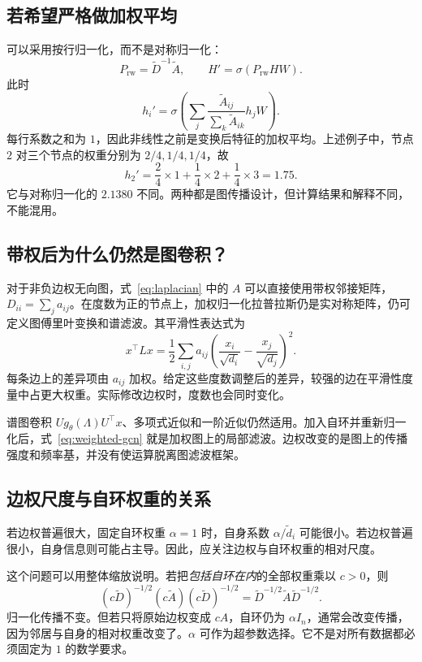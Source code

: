 \documentclass[UTF8,a4paper,11pt,fontset=fandol]{ctexart}
\begin{document}
\subsection{若希望严格做加权平均}
可以采用按行归一化，而不是对称归一化：
\begin{equation}
P_{\mathrm{rw}}=\widetilde D^{-1}\widetilde A,
\qquad H'=\sigma(P_{\mathrm{rw}}HW).
\end{equation}
此时
\begin{equation}
h_i'=\sigma\!\left(\sum_j
\frac{\widetilde A_{ij}}{\sum_k\widetilde A_{ik}}h_jW\right).
\end{equation}
每行系数之和为 $1$，因此非线性之前是变换后特征的加权平均。上述例子中，节点 $2$ 对三个节点的权重分别为 $2/4,1/4,1/4$，故
\begin{equation}
h_2'=\frac24\times1+\frac14\times2+\frac14\times3=1.75.
\end{equation}
它与对称归一化的 $2.1380$ 不同。两种都是图传播设计，但计算结果和解释不同，不能混用。

\subsection{带权后为什么仍然是图卷积？}
对于非负边权无向图，式~\eqref{eq:laplacian} 中的 $A$ 可以直接使用带权邻接矩阵，$D_{ii}=\sum_j a_{ij}$。在度数为正的节点上，加权归一化拉普拉斯仍是实对称矩阵，仍可定义图傅里叶变换和谱滤波。其平滑性表达式为
\begin{equation}
x^\top Lx=\frac12\sum_{i,j}a_{ij}
\left(\frac{x_i}{\sqrt{d_i}}-\frac{x_j}{\sqrt{d_j}}\right)^2.
\end{equation}
每条边上的差异项由 $a_{ij}$ 加权。给定这些度数调整后的差异，较强的边在平滑性度量中占更大权重。实际修改边权时，度数也会同时变化。

谱图卷积 $Ug_\theta(\Lambda)U^\top x$、多项式近似和一阶近似仍然适用。加入自环并重新归一化后，式~\eqref{eq:weighted-gcn} 就是加权图上的局部滤波。边权改变的是图上的传播强度和频率基，并没有使运算脱离图滤波框架。

\subsection{边权尺度与自环权重的关系}
若边权普遍很大，固定自环权重 $\alpha=1$ 时，自身系数 $\alpha/\widetilde d_i$ 可能很小。若边权普遍很小，自身信息则可能占主导。因此，应关注边权与自环权重的相对尺度。

这个问题可以用整体缩放说明。若把\emph{包括自环在内}的全部权重乘以 $c>0$，则
\begin{equation}
(c\widetilde D)^{-1/2}(c\widetilde A)(c\widetilde D)^{-1/2}
=\widetilde D^{-1/2}\widetilde A\widetilde D^{-1/2}.
\end{equation}
归一化传播不变。但若只将原始边权变成 $cA$，自环仍为 $\alpha I_n$，通常会改变传播，因为邻居与自身的相对权重改变了。$\alpha$ 可作为超参数选择。它不是对所有数据都必须固定为 $1$ 的数学要求。
\end{document}
